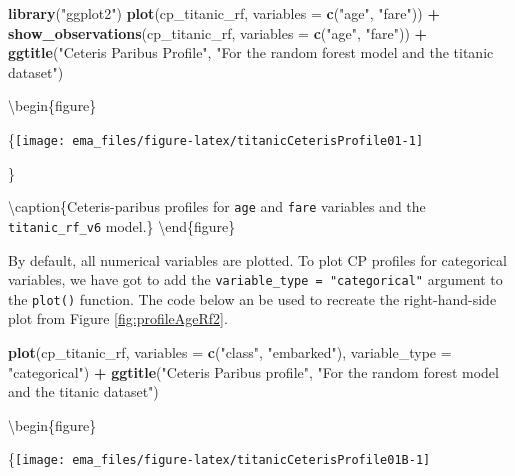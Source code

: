 \documentclass[12pt,]{krantz}
\newenvironment{Shaded}{\begin{snugshade}}{\end{snugshade}}
\newcommand{\DataTypeTok}[1]{\textcolor[rgb]{0.13,0.29,0.53}{#1}}
\newcommand{\KeywordTok}[1]{\textcolor[rgb]{0.13,0.29,0.53}{\textbf{#1}}}
\newcommand{\NormalTok}[1]{#1}
\newcommand{\OperatorTok}[1]{\textcolor[rgb]{0.81,0.36,0.00}{\textbf{#1}}}
\newcommand{\StringTok}[1]{\textcolor[rgb]{0.31,0.60,0.02}{#1}}
\begin{document}
\begin{Shaded}
\begin{Highlighting}[]
\KeywordTok{library}\NormalTok{(}\StringTok{"ggplot2"}\NormalTok{)}
\KeywordTok{plot}\NormalTok{(cp_titanic_rf, }\DataTypeTok{variables =} \KeywordTok{c}\NormalTok{(}\StringTok{"age"}\NormalTok{, }\StringTok{"fare"}\NormalTok{)) }\OperatorTok{+}
\StringTok{  }\KeywordTok{show_observations}\NormalTok{(cp_titanic_rf, }\DataTypeTok{variables =} \KeywordTok{c}\NormalTok{(}\StringTok{"age"}\NormalTok{, }\StringTok{"fare"}\NormalTok{)) }\OperatorTok{+}
\StringTok{  }\KeywordTok{ggtitle}\NormalTok{(}\StringTok{"Ceteris Paribus Profile"}\NormalTok{, }
            \StringTok{"For the random forest model and the titanic dataset"}\NormalTok{)}
\end{Highlighting}
\end{Shaded}

\textbackslash{}begin\{figure\}

\{\centering \texttt{[image: ema\_files/figure-latex/titanicCeterisProfile01-1]}

\}

\textbackslash{}caption\{Ceteris-paribus profiles for \texttt{age} and \texttt{fare} variables and the \texttt{titanic\_rf\_v6} model.\}\label{fig:titanicCeterisProfile01}
\textbackslash{}end\{figure\}

By default, all numerical variables are plotted.
To plot CP profiles for categorical variables, we have got to add the \texttt{variable\_type\ =\ "categorical"} argument to the \texttt{plot()} function. The code below an be used to recreate the right-hand-side plot from Figure \ref{fig:profileAgeRf2}.

\begin{Shaded}
\begin{Highlighting}[]
\KeywordTok{plot}\NormalTok{(cp_titanic_rf, }\DataTypeTok{variables =} \KeywordTok{c}\NormalTok{(}\StringTok{"class"}\NormalTok{, }\StringTok{"embarked"}\NormalTok{), }\DataTypeTok{variable_type =} \StringTok{"categorical"}\NormalTok{) }\OperatorTok{+}
\StringTok{  }\KeywordTok{ggtitle}\NormalTok{(}\StringTok{"Ceteris Paribus profile"}\NormalTok{, }
            \StringTok{"For the random forest model and the titanic dataset"}\NormalTok{)}
\end{Highlighting}
\end{Shaded}

\textbackslash{}begin\{figure\}

\{\centering \texttt{[image: ema\_files/figure-latex/titanicCeterisProfile01B-1]}
\end{document}
